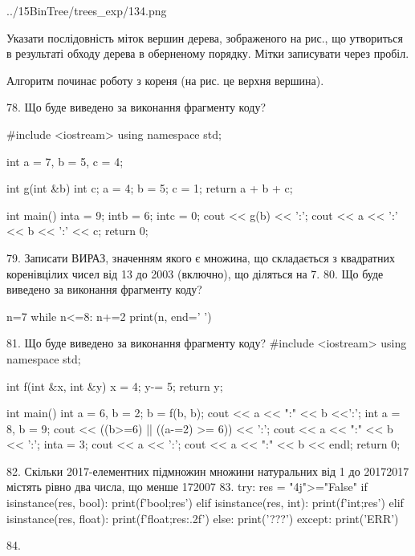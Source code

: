 \documentclass[11pt]{article}
\begin{document}
\begin{center}
	{../15BinTree/trees_exp/134.png}
\end{center}
Указати послідовність міток вершин дерева, зображеного на рис., що утвориться в результаті обходу дерева в оберненому порядку. Мітки записувати через пробіл.\par Алгоритм починає роботу з кореня (на рис. це верхня вершина).

78. Що буде виведено за виконання фрагменту коду?

#include <iostream>
using namespace std;

int a = 7, b = 5, c = 4;

int g(int &b){
int c;    a = 4;
    b = 5;
    c = 1;
    return a + b + c;
}

int main(){
    inta = 9;
    intb = 6;
    intc = 0;
    cout << g(b) << ':';
    cout << a << ':' << b << ':' << c;
    return 0; 
}

79. 
Записати ВИРАЗ, значенням якого є множина, що складається з квадратних коренівцілих чисел від 13 до 2003 (включно), що діляться на 7.
80. Що буде виведено за виконання фрагменту коду?

n=7
while n<=8:
    n+=2
print(n, end=' ')


81. Що буде виведено за виконання фрагменту коду?
#include <iostream>
using namespace std;

int f(int &x, int &y){
    x = 4;
    y-= 5;
    return y;
}

int main(){
    int a = 6, b = 2;
    b = f(b, b);
    cout << a << ":" << b <<':';
    {
        int a = 8, b = 9;
        cout << ((b>=6) || ((a-=2) >= 6)) << ':';
        cout << a << ":" << b << ':';
    }
    {
        inta = 3;
        cout << a << ':';
    }
    cout << a << ":" << b << endl;
    return 0;
}


82. 
Скільки 2017-елементних підмножин множини натуральних від 1 до 20172017 містять рівно два числа, що менше 172007
83. 
try:
    res = "4j">="False"
    if isinstance(res, bool):
        print(f'bool;{res}')
    elif isinstance(res, int):
        print(f'int;{res}')
    elif isinstance(res, float):
        print(f'float;{res:.2f}')
    else:
        print('???')
except:
    print('ERR')

84. 
\end{document}
